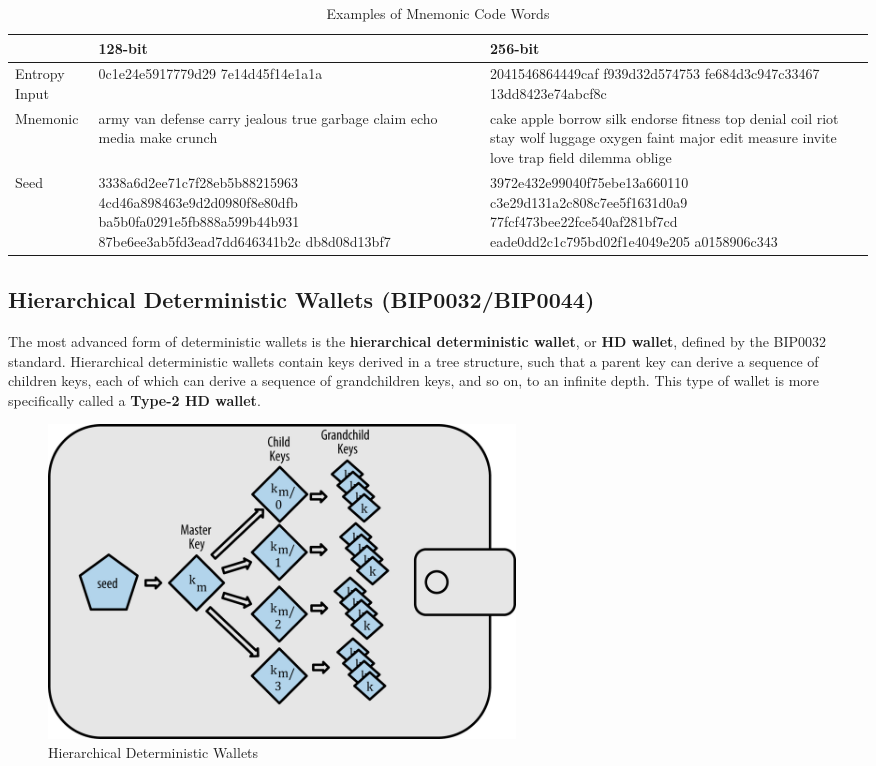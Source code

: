 \documentclass{article}
\begin{document}
    \begin{table}[H]
      \centering
      \begin{tabular}{|l|p{5cm}|p{5cm}|}
      \hline
       & \textbf{128-bit} & \textbf{256-bit} \\
      \hline
      Entropy Input & 0c1e24e5917779d29 7e14d45f14e1a1a & 2041546864449caf f939d32d574753 fe684d3c947c33467 13dd8423e74abcf8c \\
      \hline
      Mnemonic & army van defense carry jealous true garbage claim echo media make crunch & cake apple borrow silk endorse fitness top denial coil riot stay wolf luggage oxygen faint major edit measure invite love trap field dilemma oblige \\
      \hline
      Seed & 
      3338a6d2ee71c7f28eb5b88215963
      4cd46a898463e9d2d0980f8e80dfb
      ba5b0fa0291e5fb888a599b44b931
      87be6ee3ab5fd3ead7dd646341b2c
      db8d08d13bf7 & 
      3972e432e99040f75ebe13a660110
      c3e29d131a2c808c7ee5f1631d0a9
      77fcf473bee22fce540af281bf7cd
      eade0dd2c1c795bd02f1e4049e205
      a0158906c343 \\
      \hline
      \end{tabular}
      \caption{Examples of Mnemonic Code Words}
    \end{table}

  \subsection{Hierarchical Deterministic Wallets (BIP0032/BIP0044)}

    The most advanced form of deterministic wallets is the \textbf{hierarchical deterministic wallet}, or \textbf{HD wallet}, defined by the BIP0032 standard. Hierarchical deterministic wallets contain keys derived in a tree structure, such that a parent key can derive a sequence of children keys, each of which can derive a sequence of grandchildren keys, and so on, to an infinite depth. This type of wallet is more specifically called a \textbf{Type-2 HD wallet}.

    \begin{figure}[H]
    \centering
    \includegraphics[width=0.6\textwidth]{img/HD_wallets.png}
    \caption{Hierarchical Deterministic Wallets}
    \end{figure}
\end{document}
